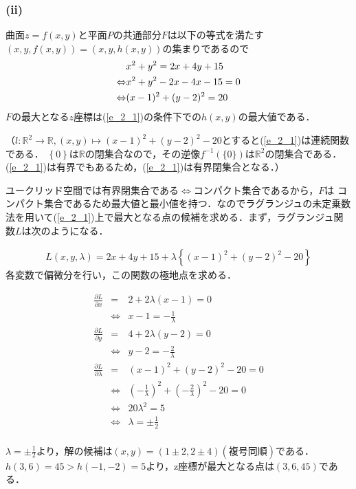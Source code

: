 \documentclass[11pt, titlepage]{jsarticle}
\begin{document}
\newpage
\subsubsection*{(ii)}
曲面$z=f(x,y)$と平面$P$の共通部分$F$は以下の等式を満たす$(x, y, f(x,y))=(x,y,h(x,y))$の集まりであるので
\begin{eqnarray}
  &x^2+y^2=2x+4y+15 \notag\\
  \Leftrightarrow &x^2+y^2-2x-4x-15=0 \notag\\
  \Leftrightarrow &(x-1)^2 + (y-2)^2 = 20 \label{e_2_1}
\end{eqnarray}
$F$の最大となる$z$座標は(\ref{e_2_1})の条件下での$h(x,y)$の最大値である．

（$l: \mathbb R^2 \rightarrow \mathbb R, (x,y)\mapsto (x-1)^2+(y-2)^2-20$とすると(\ref{e_2_1})は連続関数である．
$\left\{ 0 \right\}$は$\mathbb R$の閉集合なので，その逆像$f^{-1}(\{0\})$は$\mathbb R^2$の閉集合である．(\ref{e_2_1})は有界でもあるため，(\ref{e_2_1})は有界閉集合となる．）

ユークリッド空間では$有界閉集合である \Leftrightarrow コンパクト集合である$から，$F$は
コンパクト集合であるため最大値と最小値を持つ．なのでラグランジュの未定乗数法を用いて(\ref{e_2_1})上で最大となる点の候補を求める．まず，ラグランジュ関数$L$は次のようになる．

\begin{eqnarray*}
  L(x,y,\lambda)=2x+4y+15 + \lambda\left\{ (x-1)^2 + (y-2)^2 - 20 \right\}
\end{eqnarray*}
各変数で偏微分を行い，この関数の極地点を求める．

\begin{eqnarray*}
  \frac{\partial L}{\partial x}&=&2+2\lambda(x-1)=0 \\
  &\Leftrightarrow& x-1=-\frac{1}{\lambda} \\
  \frac{\partial L}{\partial y}&=&4+2\lambda(y-2)=0 \\
  &\Leftrightarrow& y-2=-\frac{2}{\lambda} \\
  \frac{\partial L}{\partial \lambda}&=&(x-1)^2 + (y-2)^2-20=0 \\
  &\Leftrightarrow&(-\frac{1}{\lambda})^2 + (-\frac{2}{\lambda})^2-20=0 \\
  &\Leftrightarrow&20\lambda^2=5\\
  &\Leftrightarrow&\lambda=\pm \frac{1}{2}\\
\end{eqnarray*}

$\lambda=\pm \frac{1}{2}$より，解の候補は$(x,y)=\left( 1\pm2,  2\pm4 \right) (複号同順)$である．$h(3,6) = 45 > h(-1, -2) = 5$より，z座標が最大となる点は$\left(3, 6, 45\right)$である．
\end{document}
